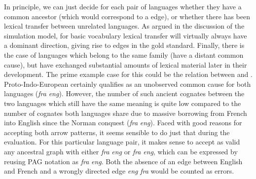 In principle, we can just decide for each pair of languages whether they have a common ancestor (which would correspond to a \arrowAA edge), or whether there has been lexical transfer between unrelated languages. As argued in the discussion of the simulation model, for basic vocabulary lexical transfer will virtually always have a dominant direction, giving rise to \arrowLA edges in the gold standard. Finally, there is the case of languages which belong to the same family (have a distant common cause), but have exchanged substantial amounts of lexical material later in their development. The prime example case for this could be the relation between  and . Proto-Indo-European certainly qualifies as an unobserved common cause for both languages (\textit{fra} \arrowAA \textit{eng}). However, the number of such ancient cognates between the two languages which still have the same meaning is quite low compared to the number of cognates both languages share due to massive borrowing from 
French into English since the Norman conquest (\textit{fra} \arrowLA \textit{eng}). Faced with good reasons for accepting both arrow patterns, it seems sensible to do just that during the evaluation. For this particular language pair, it makes sense to accept as valid any ancestral graph with either \textit{fra} \arrowAA \textit{eng} or \textit{fra} \arrowLA \textit{eng}, which can be expressed by reusing PAG notation as \textit{fra} \arrowOA \textit{eng}. Both the absence of an edge between English and French and a wrongly directed edge \textit{eng} \arrowLA \textit{fra} would be counted as errors.

